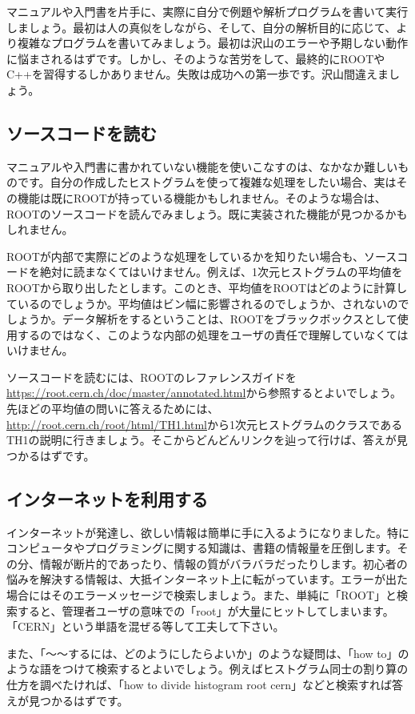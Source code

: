 マニュアルや入門書を片手に、実際に自分で例題や解析プログラムを書いて実行しましょう。最初は人の真似をしながら、そして、自分の解析目的に応じて、より複雑なプログラムを書いてみましょう。最初は沢山のエラーや予期しない動作に悩まされるはずです。しかし、そのような苦労をして、最終的にROOTやC++を習得するしかありません。失敗は成功への第一歩です。沢山間違えましょう。

\subsection{ソースコードを読む}

マニュアルや入門書に書かれていない機能を使いこなすのは、なかなか難しいものです。自分の作成したヒストグラムを使って複雑な処理をしたい場合、実はその機能は既にROOTが持っている機能かもしれません。そのような場合は、ROOTのソースコードを読んでみましょう。既に実装された機能が見つかるかもしれません。

ROOTが内部で実際にどのような処理をしているかを知りたい場合も、ソースコードを絶対に読まなくてはいけません。例えば、1次元ヒストグラムの平均値をROOTから取り出したとします。このとき、平均値をROOTはどのように計算しているのでしょうか。平均値はビン幅に影響されるのでしょうか、されないのでしょうか。データ解析をするということは、ROOTをブラックボックスとして使用するのではなく、このような内部の処理をユーザの責任で理解していなくてはいけません。

ソースコードを読むには、ROOTのレファレンスガイドを\url{https://root.cern.ch/doc/master/annotated.html}から参照するとよいでしょう。先ほどの平均値の問いに答えるためには、\url{http://root.cern.ch/root/html/TH1.html}から1次元ヒストグラムのクラスであるTH1の説明に行きましょう。そこからどんどんリンクを辿って行けば、答えが見つかるはずです。

\subsection{インターネットを利用する}
インターネットが発達し、欲しい情報は簡単に手に入るようになりました。特にコンピュータやプログラミングに関する知識は、書籍の情報量を圧倒します。その分、情報が断片的であったり、情報の質がバラバラだったりします。初心者の悩みを解決する情報は、大抵インターネット上に転がっています。エラーが出た場合にはそのエラーメッセージで検索しましょう。また、単純に「ROOT」と検索すると、管理者ユーザの意味での「root」が大量にヒットしてしまいます。「CERN」という単語を混ぜる等して工夫して下さい。

また、「〜〜するには、どのようにしたらよいか」のような疑問は、「how to」のような語をつけて検索するとよいでしょう。例えばヒストグラム同士の割り算の仕方を調べたければ、「how to divide histogram root cern」などと検索すれば答えが見つかるはずです。

